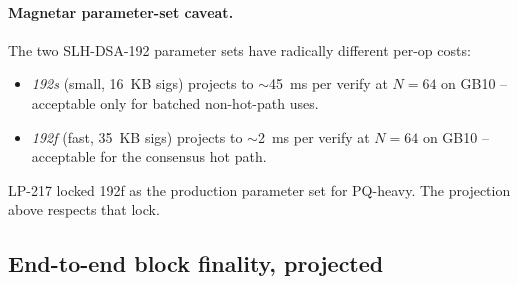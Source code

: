 \paragraph{Magnetar parameter-set caveat.} The two SLH-DSA-192
parameter sets have radically different per-op costs:

\begin{itemize}[leftmargin=2em,nosep]
\item \emph{192s} (small, \SI{16}{KB} sigs) projects to
  $\sim$\SI{45}{\milli\second} per verify at $N{=}64$ on GB10 --
  acceptable only for batched non-hot-path uses.
\item \emph{192f} (fast, \SI{35}{KB} sigs) projects to
  $\sim$\SI{2}{\milli\second} per verify at $N{=}64$ on GB10 --
  acceptable for the consensus hot path.
\end{itemize}

LP-217 \cite{lp217} locked 192f as the production parameter
set for PQ-heavy. The projection above respects that lock.

\subsection{End-to-end block finality, projected}

